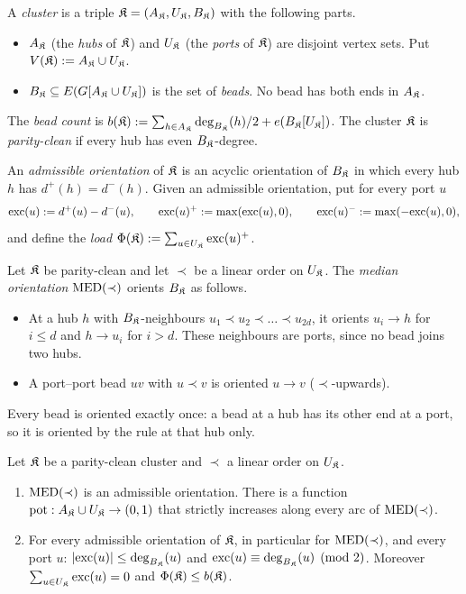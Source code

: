 \begin{definition}[clusters]\label{s6:defCluster}
A \emph{cluster} is a triple $\mathfrak{K}=(A_{\mathfrak{K}},U_{\mathfrak{K}},B_{\mathfrak{K}})$ with the following parts.
\begin{itemize}
\item $A_{\mathfrak{K}}$ (the \emph{hubs} of $\mathfrak{K}$) and $U_{\mathfrak{K}}$ (the \emph{ports} of $\mathfrak{K}$) are disjoint vertex sets. Put $V(\mathfrak{K}):=A_{\mathfrak{K}}\cup U_{\mathfrak{K}}$.
\item $B_{\mathfrak{K}}\subseteq E(G[A_{\mathfrak{K}}\cup U_{\mathfrak{K}}])$ is the set of \emph{beads}. No bead has both ends in $A_{\mathfrak{K}}$.
\end{itemize}
The \emph{bead count} is $b(\mathfrak{K}):=\sum_{h\in A_{\mathfrak{K}}}\deg_{B_{\mathfrak{K}}}(h)/2+e(B_{\mathfrak{K}}[U_{\mathfrak{K}}])$. The cluster $\mathfrak{K}$ is \emph{parity-clean} if every hub has even $B_{\mathfrak{K}}$-degree.

An \emph{admissible orientation} of $\mathfrak{K}$ is an acyclic orientation of $B_{\mathfrak{K}}$ in which every hub $h$ has $d^+(h)=d^-(h)$. Given an admissible orientation, put for every port $u$
\[
\mathrm{exc}(u):=d^+(u)-d^-(u),\qquad \mathrm{exc}(u)^+:=\max(\mathrm{exc}(u),0),\qquad \mathrm{exc}(u)^-:=\max(-\mathrm{exc}(u),0),
\]
and define the \emph{load} $\Phi(\mathfrak{K}):=\sum_{u\in U_{\mathfrak{K}}}\mathrm{exc}(u)^+$.

Let $\mathfrak{K}$ be parity-clean and let $\prec$ be a linear order on $U_{\mathfrak{K}}$. The \emph{median orientation} $\mathrm{MED}(\prec)$ orients $B_{\mathfrak{K}}$ as follows.
\begin{itemize}
\item At a hub $h$ with $B_{\mathfrak{K}}$-neighbours $u_1\prec u_2\prec\dots\prec u_{2d}$, it orients $u_i\to h$ for $i\le d$ and $h\to u_i$ for $i>d$. These neighbours are ports, since no bead joins two hubs.
\item A port--port bead $uv$ with $u\prec v$ is oriented $u\to v$ ($\prec$-upwards).
\end{itemize}
Every bead is oriented exactly once: a bead at a hub has its other end at a port, so it is oriented by the rule at that hub only.
\end{definition}

\begin{lemma}\label{s6:lemMED}
Let $\mathfrak{K}$ be a parity-clean cluster and $\prec$ a linear order on $U_{\mathfrak{K}}$.
\begin{enumerate}
\item[(a)] $\mathrm{MED}(\prec)$ is an admissible orientation. There is a function $\mathrm{pot}:A_{\mathfrak{K}}\cup U_{\mathfrak{K}}\to(0,1)$ that strictly increases along every arc of $\mathrm{MED}(\prec)$.
\item[(b)] For every admissible orientation of $\mathfrak{K}$, in particular for $\mathrm{MED}(\prec)$, and every port $u$: $|\mathrm{exc}(u)|\le\deg_{B_{\mathfrak{K}}}(u)$ and $\mathrm{exc}(u)\equiv\deg_{B_{\mathfrak{K}}}(u)\pmod 2$. Moreover $\sum_{u\in U_{\mathfrak{K}}}\mathrm{exc}(u)=0$ and $\Phi(\mathfrak{K})\le b(\mathfrak{K})$.
\end{enumerate}
\deps{\ref{s6:defCluster}}
\end{lemma}

